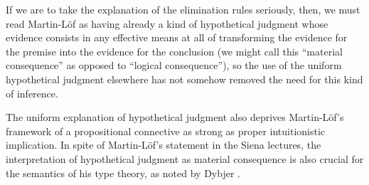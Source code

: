 \documentclass[11pt]{amsart}
\theoremstyle{definition}
\theoremstyle{remark}
\numberwithin{equation}{section}
\begin{document}
If we are to take the explanation of the elimination rules seriously, then, we
must read Martin-L\"of as having already a kind of hypothetical judgment whose
evidence consists in any effective means at all of transforming the evidence for
the premise into the evidence for the conclusion (we might call this ``material
consequence'' as opposed to ``logical consequence''), so the use of the uniform
hypothetical judgment elsewhere has not somehow removed the need for this kind
of inference.

The uniform explanation of hypothetical judgment also deprives Martin-L\"of's
framework of a propositional connective as strong as proper intuitionistic
implication. In spite of Martin-L\"of's statement in the Siena lectures, the
interpretation of hypothetical judgment as material consequence is also crucial
for the semantics of his type theory, as noted by Dybjer \cite{dybjer:testing}.




\end{document}
